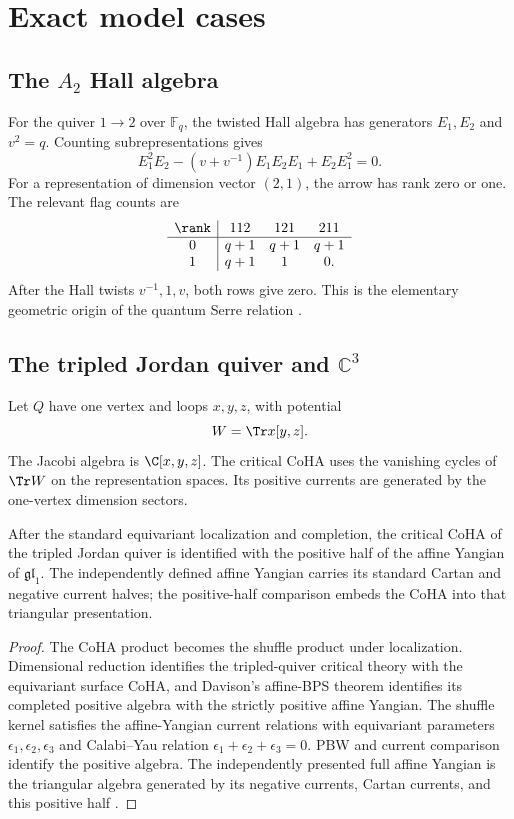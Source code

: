 \part{Exact model cases}

\chapter{The \texorpdfstring{$A_2$}{A2} Hall algebra}
For the quiver $1\to2$ over $\mathbb F_q$, the twisted Hall algebra has generators $E_1,E_2$ and $v^2=q$. Counting subrepresentations gives
\[
 E_1^2E_2-(v+v^{-1})E_1E_2E_1+E_2E_1^2=0.
\]
For a representation of dimension vector $(2,1)$, the arrow has rank zero or one. The relevant flag counts are
\[
\begin{array}{c|ccc}
\rank&112&121&211\\ \hline
0&q+1&q+1&q+1\\
1&q+1&1&0.
\end{array}
\]
After the Hall twists $v^{-1},1,v$, both rows give zero. This is the elementary geometric origin of the quantum Serre relation \cite{Ringel,Green}.

\chapter{The tripled Jordan quiver and \texorpdfstring{$\mathbb C^3$}{C3}}
Let $Q$ have one vertex and loops $x,y,z$, with potential
\[
 W=\Tr x[y,z].
\]
The Jacobi algebra is $\C[x,y,z]$. The critical CoHA uses the vanishing cycles of $\Tr W$ on the representation spaces. Its positive currents are generated by the one-vertex dimension sectors.

\begin{theorem}
After the standard equivariant localization and completion, the critical CoHA of the tripled Jordan quiver is identified with the positive half of the affine Yangian of $\mathfrak{gl}_1$. The independently defined affine Yangian carries its standard Cartan and negative current halves; the positive-half comparison embeds the CoHA into that triangular presentation.
\end{theorem}
\begin{proof}
The CoHA product becomes the shuffle product under localization. Dimensional reduction identifies the tripled-quiver critical theory with the equivariant surface CoHA, and Davison's affine-BPS theorem identifies its completed positive algebra with the strictly positive affine Yangian. The shuffle kernel satisfies the affine-Yangian current relations with equivariant parameters $\epsilon_1,\epsilon_2,\epsilon_3$ and Calabi--Yau relation $\epsilon_1+\epsilon_2+\epsilon_3=0$. PBW and current comparison identify the positive algebra. The independently presented full affine Yangian is the triangular algebra generated by its negative currents, Cartan currents, and this positive half \cite{DavisonAffineBPS,DavisonMeinhardt,SVYangians,Tsymbaliuk}.
\end{proof}

